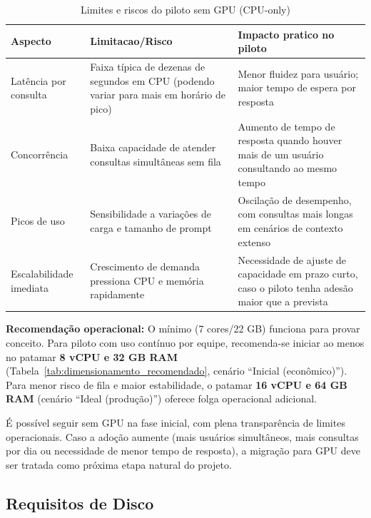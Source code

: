 \documentclass[12pt, a4paper]{article}
\begin{document}
\begin{table}[h!]
\centering
\small
\caption{Limites e riscos do piloto sem GPU (CPU-only)}
\label{tab:riscos_piloto_cpu}
\begin{tabularx}{\textwidth}{l X X}
\toprule
\textbf{Aspecto} & \textbf{Limitacao/Risco} & \textbf{Impacto pratico no piloto} \\
\midrule
Latência por consulta & Faixa típica de dezenas de segundos em CPU (podendo variar para mais em horário de pico) & Menor fluidez para usuário; maior tempo de espera por resposta \\
Concorrência & Baixa capacidade de atender consultas simultâneas sem fila & Aumento de tempo de resposta quando houver mais de um usuário consultando ao mesmo tempo \\
Picos de uso & Sensibilidade a variações de carga e tamanho de prompt & Oscilação de desempenho, com consultas mais longas em cenários de contexto extenso \\
Escalabilidade imediata & Crescimento de demanda pressiona CPU e memória rapidamente & Necessidade de ajuste de capacidade em prazo curto, caso o piloto tenha adesão maior que a prevista \\
\bottomrule
\end{tabularx}
\end{table}


\noindent\textbf{Recomendação operacional:} O mínimo (7 cores/22 GB) funciona para provar conceito. Para piloto com uso contínuo por equipe, recomenda-se iniciar ao menos no patamar \textbf{8 vCPU e 32 GB RAM} (Tabela~\ref{tab:dimensionamento_recomendado}, cenário ``Inicial (econômico)''). Para menor risco de fila e maior estabilidade, o patamar \textbf{16 vCPU e 64 GB RAM} (cenário ``Ideal (produção)'') oferece folga operacional adicional.

É possível seguir sem GPU na fase inicial, com plena transparência de limites operacionais. Caso a adoção aumente (mais usuários simultâneos, mais consultas por dia ou necessidade de menor tempo de resposta), a migração para GPU deve ser tratada como próxima etapa natural do projeto.



\subsection{Requisitos de Disco}
\end{document}
